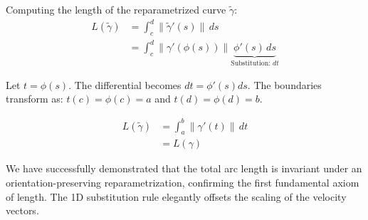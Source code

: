 \begin{math-stroke}
Computing the length of the reparametrized curve $\tilde{\gamma}$:
\begin{align*}
L(\tilde{\gamma}) &= \int_c^d \|\tilde{\gamma}'(s)\| \, ds \\
&= \int_c^d \|\gamma'(\phi(s))\| \underbrace{\phi'(s) \, ds}_{\text{Substitution: } dt}
\end{align*}

Let $t = \phi(s)$. The differential becomes $dt = \phi'(s) ds$.
The boundaries transform as: $t(c) = \phi(c) = a$ and $t(d) = \phi(d) = b$.

\begin{align*}
L(\tilde{\gamma}) &= \int_a^b \|\gamma'(t)\| \, dt \\
&= L(\gamma)
\end{align*}

\begin{explanation-of-steps}
We have successfully demonstrated that the total arc length is invariant under an orientation-preserving reparametrization, confirming the first fundamental axiom of length. The 1D substitution rule elegantly offsets the scaling of the velocity vectors.
\end{explanation-of-steps}
\end{math-stroke}